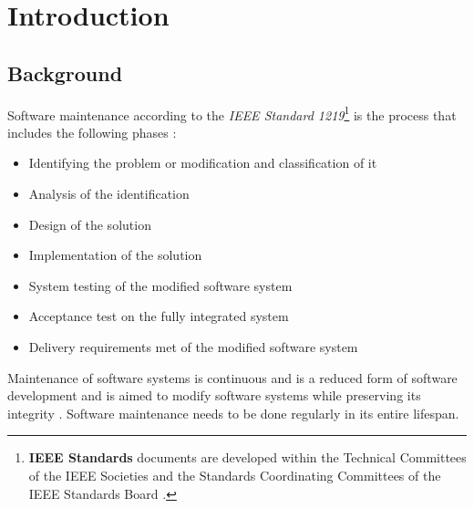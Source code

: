 \chapter{Introduction}
\label{chap:1}

\section{Background}\label{section:background}

Software maintenance according to the \textit{IEEE Standard 1219}\footnote{\textbf{IEEE Standards} documents are developed within the Technical Committees of the IEEE Societies and the Standards Coordinating Committees of the IEEE Standards Board \cite{Mamone1994}.} is the process that includes the following phases \cite{Mamone1994, Hasan2012}:
\begin{itemize}
	\item Identifying the problem or modification and classification of it
	\item Analysis of the identification
	\item Design of the solution
	\item Implementation of the solution
	\item System testing of the modified software system
	\item Acceptance test on the fully integrated system
	\item Delivery requirements met of the modified software system
\end{itemize}

Maintenance of software systems is continuous and is a reduced form of software development and is aimed to modify software systems while preserving its integrity \cite{Sneed2004, Ackermann2009}. Software maintenance needs to be done regularly in its entire lifespan. 

